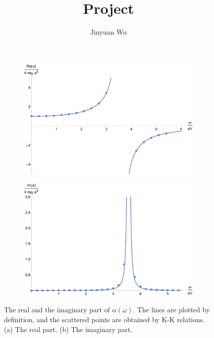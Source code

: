 \documentclass[hyperref, a4paper]{article}
\title{Project}
\author{Jinyuan Wu}
\begin{document}
\maketitle

\begin{figure}
    \centering
    \begin{subfigure}{0.45\textwidth}
        \includegraphics[width=\textwidth]{alpha-re.pdf}
    \end{subfigure}
    \begin{subfigure}{0.45\textwidth}
        \includegraphics[width=\textwidth]{alpha-im.pdf}
    \end{subfigure}
    \caption{The real and the imaginary part of $\alpha(\omega)$. The lines are plotted by definition, and the scattered points are obtained by K-K relations. (a) The real part. (b) The imaginary part.}
    \label{fig:plot}
\end{figure}
\end{document}
